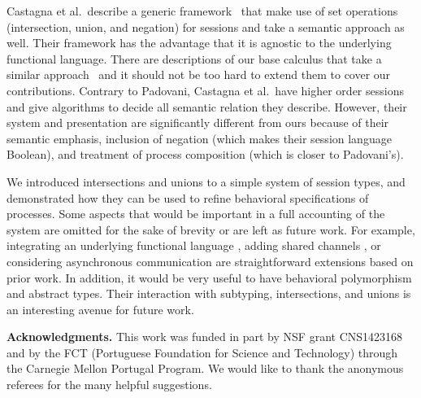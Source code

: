 \documentclass[submission,copyright,creativecommons]{eptcs}
\begin{document}
Castagna et al.\ describe a generic framework~\cite{CastagnaDGP09} that make use of set operations (intersection, union, and negation) for sessions and take a semantic approach as well. Their framework has the advantage that it is agnostic to the underlying functional language. There are descriptions of our base calculus that take a similar approach~\cite{ToninhoCP13} and it should not be too hard to extend them to cover our contributions. Contrary to Padovani, Castagna et al.\ have higher order sessions and give algorithms to decide all semantic relation they describe. However, their system and presentation are significantly different from ours because of their semantic emphasis, inclusion of negation (which makes their session language Boolean), and treatment of process composition (which is closer to Padovani's).

We introduced intersections and unions to a simple system of session types, and demonstrated how they can be used to refine behavioral specifications of processes. Some aspects that would be important in a full accounting of the system are omitted for the sake of brevity or are left as future work. For example, integrating an underlying functional language \cite{ToninhoCP13}, adding shared channels \cite{CairesP10,PfenningG15}, or considering asynchronous communication \cite{DeYoungCPT12,PfenningG15,Griffith16phd} are straightforward extensions based on prior work. In addition, it would be very useful to have behavioral polymorphism \cite{CairesPPT13} and abstract types. Their interaction with subtyping, intersections, and unions is an interesting avenue for future work.

\noindent\textbf{Acknowledgments.}
This work was funded in part by NSF grant CNS1423168 and by the FCT (Portuguese Foundation for Science and Technology) through the Carnegie Mellon Portugal Program.  We would like to thank the anonymous referees for the many helpful suggestions.






\end{document}
